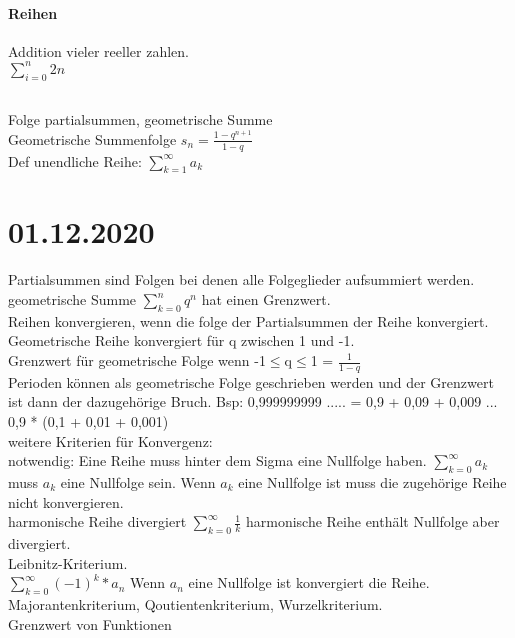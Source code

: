 \documentclass{article}
\begin{document}
	\paragraph*{Reihen}
	Addition vieler reeller zahlen. \\
	$\sum\limits_{i=0}^{n} 2n$
	\subsection*{}
	Folge partialsummen, geometrische Summe \\
	Geometrische Summenfolge $s_{n} = \frac{1 - q^{n +1}}{1 - q}$ \\
	Def unendliche Reihe: $\sum\limits_{k=1}^{\infty}a_{k}$
	\section*{01.12.2020}
	Partialsummen sind Folgen bei denen alle Folgeglieder aufsummiert werden. \\
	geometrische Summe $\sum\limits_{k=0}^{n} q^{n}$
	hat einen Grenzwert. \\
	Reihen konvergieren, wenn die folge der Partialsummen der Reihe konvergiert. \\
	Geometrische Reihe konvergiert für q zwischen 1 und -1. \\
	Grenzwert für geometrische Folge wenn -1$\le$q$\le$1 = $\frac{1}{1 - q}$ \\
	 Perioden können als geometrische Folge geschrieben werden und der Grenzwert ist dann der dazugehörige Bruch.
	 Bsp: 0,999999999 ..... = 0,9 + 0,09 + 0,009 ... \\
	 0,9 * (0,1 + 0,01 + 0,001) \\
	 weitere Kriterien für Konvergenz: \\
	 notwendig: Eine Reihe muss hinter dem Sigma eine Nullfolge haben. $\sum\limits_{k=0}^{\infty} a_{k}$ muss $a_{k}$ eine Nullfolge sein. Wenn $a_{k}$ eine Nullfolge ist muss die zugehörige Reihe nicht konvergieren. \\
	 harmonische Reihe divergiert $\sum\limits_{k=0}^{\infty} \frac{1}{k}$
	 harmonische Reihe enthält Nullfolge aber divergiert. \\
	  Leibnitz-Kriterium. \\
	  $\sum\limits_{k=0}^{\infty} (-1)^{k} * a_{n}$
	  Wenn $a_{n}$ eine Nullfolge ist konvergiert die Reihe. \\
	  Majorantenkriterium, Qoutientenkriterium, Wurzelkriterium. \\
	  Grenzwert von Funktionen \\
\end{document}
